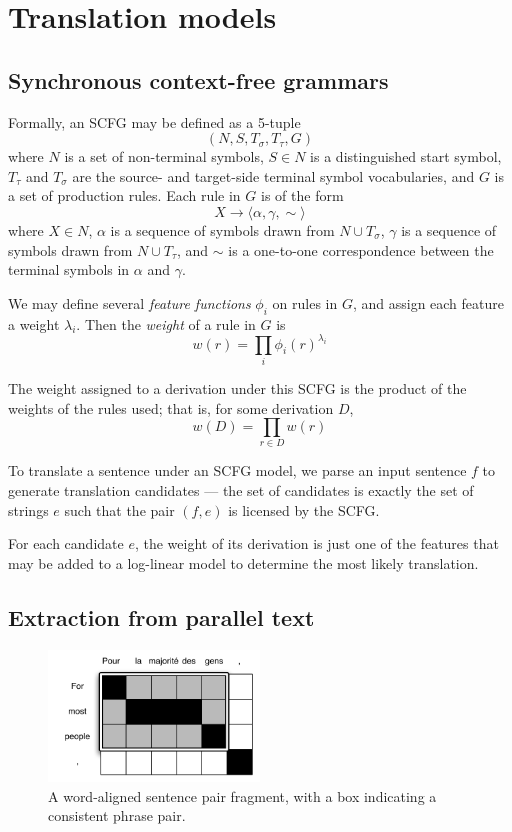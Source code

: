 \documentclass[a4paper]{article}
\begin{document}
\section{Translation models}

\subsection{Synchronous context-free grammars}

Formally, an SCFG may be defined as a 5-tuple
$$(N,S,T_\sigma,T_\tau,G)$$
where $N$ is a set of non-terminal symbols, $S \in N$ is a distinguished start symbol, $T_\tau$ and $T_\sigma$ are the source- and target-side terminal symbol vocabularies, and $G$ is a set of production rules. Each rule in $G$ is of the form
$$X \to \langle \alpha, \gamma, \sim \rangle$$
where $X \in N$, $\alpha$ is a sequence of symbols drawn from $N \cup T_\sigma$, $\gamma$ is a sequence of symbols drawn from $N \cup T_\tau$, and $\sim$ is a one-to-one correspondence between the terminal symbols in $\alpha$ and $\gamma$.

We may define several {\em feature functions} $\phi_i$ on rules in $G$, and assign each feature a weight $\lambda_i$. Then the {\em weight} of a rule in $G$ is
\begin{equation}
w(r) = \prod_i{\phi_i(r)^{\lambda_i}}
\end{equation}

The weight assigned to a derivation under this SCFG is the product of the weights of the rules used; that is, for some derivation $D$,
\begin{equation}
w(D) = \prod_{r \in D}{w(r)}
\end{equation}

To translate a sentence under an SCFG model, we parse an input sentence $f$ to generate translation candidates --- the set of candidates is exactly the set of strings $e$ such that the pair $(f,e)$ is licensed by the SCFG.

For each candidate $e$, the weight of its derivation is just one of the features that may be added to a log-linear model to determine the most likely translation.

\subsection{Extraction from parallel text}

\begin{figure}[t]
\includegraphics[width=0.5\textwidth]{../wmt11/figures/simple-rule}
\caption{A word-aligned sentence pair fragment, with a box indicating a consistent phrase pair.\label{fig:aligned-sentence}}
\end{figure}
\end{document}

